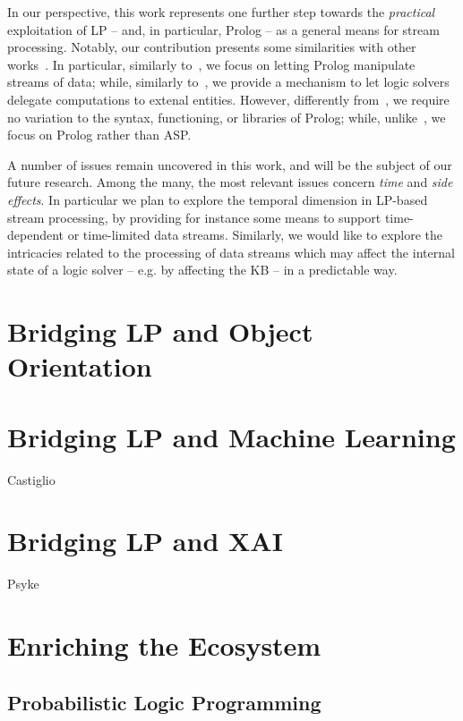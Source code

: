 \documentclass[12pt,a4paper,openright,twoside]{book}
\begin{document}
In our perspective, this work represents one further step towards the \emph{practical} exploitation of LP -- and, in particular, Prolog -- as a general means for stream processing.
%
Notably, our contribution presents some similarities with other works~\cite{Tarau2019,Redl16}.
%
In particular, similarly to~\cite{Tarau2019}, we focus on letting Prolog manipulate streams of data; while, similarly to~\cite{Redl16}, we provide a mechanism to let logic solvers delegate computations to extenal entities.
%
However, differently from~\cite{Tarau2019}, we require no variation to the syntax, functioning, or libraries of Prolog; while, unlike~\cite{Redl16}, we focus on Prolog rather than ASP.

A number of issues remain uncovered in this work, and will be the subject of our future research.
%
Among the many, the most relevant issues concern \emph{time} and \emph{side effects}.
%
In particular we plan to explore the temporal dimension in LP-based stream processing, by providing for instance some means to support time-dependent or time-limited data streams.
%
Similarly, we would like to explore the intricacies related to the processing of data streams which may affect the internal state of a logic solver -- e.g. by affecting the KB -- in a predictable way.

\chapter{Bridging LP and Object Orientation}

\cite{cco-softwarex-2021-2pkt}
\cite{kotlindsi4prolog-woa2020}

\chapter{Bridging LP and Machine Learning}

Castiglio

\chapter{Bridging LP and XAI}

Psyke

\chapter{Enriching the Ecosystem}

\section{Probabilistic Logic Programming}
\end{document}
